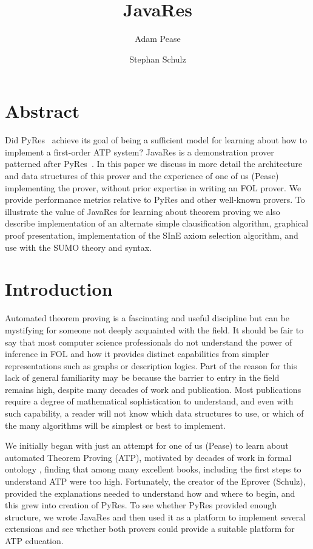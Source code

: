 \documentclass{llncs}
\title{JavaRes}
\author{Adam Pease\inst{2}
        \and Stephan Schulz\inst{1}
  }
\institute{
  Articulate Software, USA,
  \email{\tt apease@articulatesoftware.com}
  \and
  DHBW Stuttgart, Germany,
  \email{\tt schulz@eprover.org}
}
\begin{document}
\maketitle

\section{Abstract}
Did PyRes~\cite{SP:IJCAR-2020} achieve its goal of being a sufficient
model for learning about how to implement a first-order ATP system?
JavaRes is a demonstration prover patterned after
PyRes~\cite{SP:IJCAR-2020}.  In this paper we discuss in more detail
the architecture and data structures of this prover and the experience
of one of us (Pease) implementing the prover, without prior expertise
in writing an FOL prover.  We provide performance metrics relative to
PyRes and other well-known provers.  To illustrate the value of
JavaRes for learning about theorem proving we also describe
implementation of an alternate simple clausification algorithm,
graphical proof presentation, implementation of the SInE axiom
selection algorithm, and use with the SUMO theory and syntax.


\section{Introduction}

Automated theorem proving is a fascinating and useful discipline but
can be mystifying for someone not deeply acquainted with the field.
It should be fair to say that most computer science professionals do
not understand the power of inference in FOL and how it provides
distinct capabilities from simpler representations such as graphs or
description logics.  Part of the reason for this lack of general
familiarity may be because the barrier to entry in the field remains
high, despite many decades of work and publication.  Most publications
require a degree of mathematical sophistication to understand, and
even with such capability, a reader will not know which data
structures to use, or which of the many algorithms will be simplest or best to
implement.

We initially began with just an attempt for one of us (Pease) to learn
about automated Theorem Proving (ATP), motivated by decades of work in formal ontology \cite{np01,p11},
finding that among many excellent books, including \cite{Harrison:HPL-2009}
the first steps to understand ATP were too high.  Fortunately, the
creator of the Eprover (Schulz), provided the explanations needed to
understand how and where to begin, and this grew into creation of
PyRes.  To see whether PyRes provided enough structure, we wrote
JavaRes and then used it as a platform to implement several extensions
and see whether both provers could provide a suitable platform for ATP
education.
\end{document}
